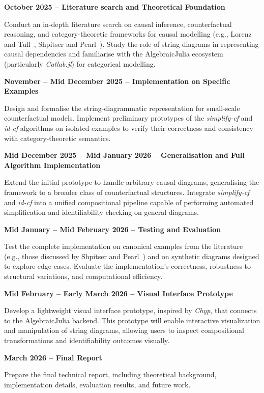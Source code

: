 \documentclass[12pt,a4paper]{article}
\begin{document}
\textbf{October 2025 – Literature search and Theoretical Foundation}

Conduct an in-depth literature search on causal inference, counterfactual reasoning, and category-theoretic frameworks for causal modelling (e.g., Lorenz and Tull~\cite{lorenz2023causal}, Shpitser and Pearl~\cite{shpitser2008complete}).  
Study the role of string diagrams in representing causal dependencies and familiarise with the AlgebraicJulia ecosystem (particularly \textit{Catlab.jl}) for categorical modelling.

\textbf{November – Mid December 2025 – Implementation on Specific Examples}

Design and formalise the string-diagrammatic representation for small-scale counterfactual models.  
Implement preliminary prototypes of the \textit{simplify-cf} and \textit{id-cf} algorithms on isolated examples to verify their correctness and consistency with category-theoretic semantics.

\textbf{Mid December 2025 – Mid January 2026 – Generalisation and Full Algorithm Implementation}

Extend the initial prototype to handle arbitrary causal diagrams, generalising the framework to a broader class of counterfactual structures.  
Integrate \textit{simplify-cf} and \textit{id-cf} into a unified compositional pipeline capable of performing automated simplification and identifiability checking on general diagrams.

\textbf{Mid January – Mid February 2026 – Testing and Evaluation}

Test the complete implementation on canonical examples from the literature (e.g., those discussed by Shpitser and Pearl~\cite{shpitser2008complete}) and on synthetic diagrams designed to explore edge cases.  
Evaluate the implementation’s correctness, robustness to structural variations, and computational efficiency.

\textbf{Mid February – Early March 2026 – Visual Interface Prototype}

Develop a lightweight visual interface prototype, inspired by \textit{Chyp}, that connects to the AlgebraicJulia backend.  
This prototype will enable interactive visualization and manipulation of string diagrams, allowing users to inspect compositional transformations and identifiability outcomes visually.

\textbf{March 2026 – Final Report}

Prepare the final technical report, including theoretical background, implementation details, evaluation results, and future work.  
\end{document}
